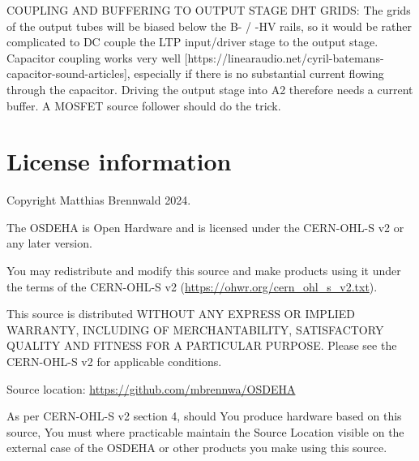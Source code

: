 COUPLING AND BUFFERING TO OUTPUT STAGE DHT GRIDS: The grids of the output tubes will be biased below the B- / -HV rails, so it would be rather complicated to DC couple the LTP input/driver stage to the output stage. Capacitor coupling works very well [https://linearaudio.net/cyril-batemans-capacitor-sound-articles], especially if there is no substantial current flowing through the capacitor. Driving the output stage into A2 therefore needs a current buffer. A MOSFET source follower should do the trick.





\section{License information} 
Copyright Matthias Brennwald 2024.                                                    

The OSDEHA is Open Hardware and is licensed under the CERN-OHL-S v2 or any later version.

You may redistribute and modify this source and make products using it under the terms of the CERN-OHL-S v2 (\url{https://ohwr.org/cern_ohl_s_v2.txt}).

This source is distributed WITHOUT ANY EXPRESS OR IMPLIED WARRANTY, INCLUDING OF MERCHANTABILITY, SATISFACTORY QUALITY AND FITNESS FOR A PARTICULAR PURPOSE. Please see the CERN-OHL-S v2 for applicable conditions.

Source location: \url{https://github.com/mbrennwa/OSDEHA}

As per CERN-OHL-S v2 section 4, should You produce hardware based on this source, You must where practicable maintain the Source Location visible on the external case of the OSDEHA or other products you make using this source.            






